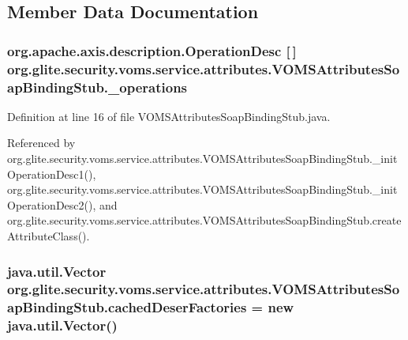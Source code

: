 \subsection{Member Data Documentation}
\hypertarget{classorg_1_1glite_1_1security_1_1voms_1_1service_1_1attributes_1_1VOMSAttributesSoapBindingStub_af9b983e25b8e2b37315a0b6242938b87}{
\subsubsection[{\_\-operations}]{\setlength{\rightskip}{0pt plus 5cm}org.apache.axis.description.OperationDesc \mbox{[}$\,$\mbox{]} {\bf org.glite.security.voms.service.attributes.VOMSAttributesSoapBindingStub.\_\-operations}}}
\label{classorg_1_1glite_1_1security_1_1voms_1_1service_1_1attributes_1_1VOMSAttributesSoapBindingStub_af9b983e25b8e2b37315a0b6242938b87}


Definition at line 16 of file VOMSAttributesSoapBindingStub.java.



Referenced by org.glite.security.voms.service.attributes.VOMSAttributesSoapBindingStub.\_\-initOperationDesc1(), org.glite.security.voms.service.attributes.VOMSAttributesSoapBindingStub.\_\-initOperationDesc2(), and org.glite.security.voms.service.attributes.VOMSAttributesSoapBindingStub.createAttributeClass().

\hypertarget{classorg_1_1glite_1_1security_1_1voms_1_1service_1_1attributes_1_1VOMSAttributesSoapBindingStub_a2645f73889348e5b4d836178e95f5051}{
\subsubsection[{cachedDeserFactories}]{\setlength{\rightskip}{0pt plus 5cm}java.util.Vector {\bf org.glite.security.voms.service.attributes.VOMSAttributesSoapBindingStub.cachedDeserFactories} = new java.util.Vector()}}
\label{classorg_1_1glite_1_1security_1_1voms_1_1service_1_1attributes_1_1VOMSAttributesSoapBindingStub_a2645f73889348e5b4d836178e95f5051}


